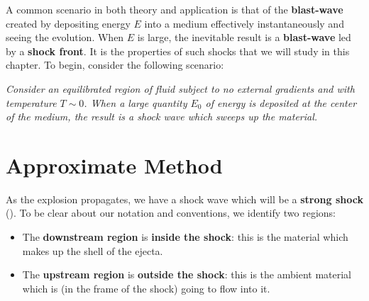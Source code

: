 A common scenario in both theory and application is that of the \textbf{blast-wave} created by depositing energy $E$ into a medium effectively instantaneously and seeing the evolution. When $E$ is large, the inevitable result is a \textbf{blast-wave} led by a \textbf{shock front}. It is the properties of such shocks that we will study in this chapter. To begin, consider the following scenario:

\begin{center}
    \textit{Consider an equilibrated region of fluid subject to no external gradients and with temperature $T \sim 0$. When a large quantity $E_0$ of energy is deposited at the center of the medium, the result is a shock wave which sweeps up the material.}
\end{center}

\section{Approximate Method}

As the explosion propagates, we have a shock wave which will be a \textbf{strong shock} (). To be clear about our notation and conventions, we identify two regions:
\vspace{0.25cm}

\begin{itemize}
    \item The \textbf{downstream region} is \textbf{inside the shock}: this is the material which makes up the shell of the ejecta.
    \item The \textbf{upstream region} is \textbf{outside the shock}: this is the ambient material which is (in the frame of the shock) going to flow into it.
\end{itemize}

